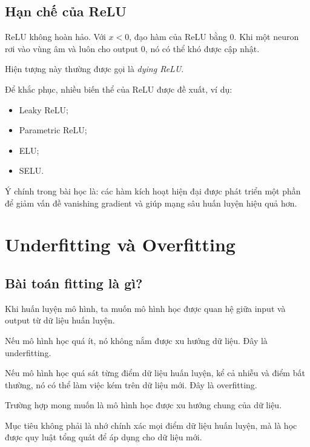 \subsection{Hạn chế của ReLU}

ReLU không hoàn hảo. Với $x<0$, đạo hàm của ReLU bằng 0. Khi một neuron rơi vào vùng âm và luôn cho output 0, nó có thể khó được cập nhật.

Hiện tượng này thường được gọi là \textit{dying ReLU}.

Để khắc phục, nhiều biến thể của ReLU được đề xuất, ví dụ:

\begin{itemize}
    \item Leaky ReLU;
    \item Parametric ReLU;
    \item ELU;
    \item SELU.
\end{itemize}

\begin{luuy}
Ý chính trong bài học là: các hàm kích hoạt hiện đại được phát triển một phần để giảm vấn đề vanishing gradient và giúp mạng sâu huấn luyện hiệu quả hơn.
\end{luuy}

\section{Underfitting và Overfitting}

\subsection{Bài toán fitting là gì?}

Khi huấn luyện mô hình, ta muốn mô hình học được quan hệ giữa input và output từ dữ liệu huấn luyện.

Nếu mô hình học quá ít, nó không nắm được xu hướng dữ liệu. Đây là underfitting.

Nếu mô hình học quá sát từng điểm dữ liệu huấn luyện, kể cả nhiễu và điểm bất thường, nó có thể làm việc kém trên dữ liệu mới. Đây là overfitting.

Trường hợp mong muốn là mô hình học được xu hướng chung của dữ liệu.

\begin{ghinho}
Mục tiêu không phải là nhớ chính xác mọi điểm dữ liệu huấn luyện, mà là học được quy luật tổng quát để áp dụng cho dữ liệu mới.
\end{ghinho}

